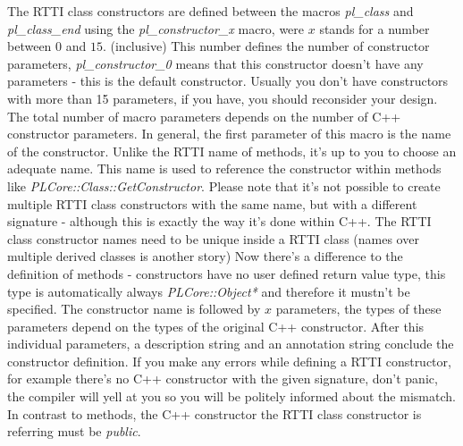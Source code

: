 The RTTI class constructors are defined between the macros \emph{pl\_class} and \emph{pl\_class\_end} using the \emph{pl\_constructor\_x} macro, were $x$ stands for a number between $0$ and $15$. (inclusive) This number defines the number of constructor parameters, \emph{pl\_constructor\_0} means that this constructor doesn't have any parameters - this is the default constructor. Usually you don't have constructors with more than 15 parameters, if you have, you should reconsider your design. The total number of macro parameters depends on the number of C++ constructor parameters. In general, the first parameter of this macro is the name of the constructor. Unlike the RTTI name of methods, it's up to you to choose an adequate name. This name is used to reference the constructor within methods like \emph{PLCore::Class::GetConstructor}. Please note that it's not possible to create multiple RTTI class constructors with the same name, but with a different signature - although this is exactly the way it's done within C++. The RTTI class constructor names need to be unique inside a RTTI class (names over multiple derived classes is another story) Now there's a difference to the definition of methods - constructors have no user defined return value type, this type is automatically always \emph{PLCore::Object*} and therefore it mustn't be specified. The constructor name is followed by $x$ parameters, the types of these parameters depend on the types of the original C++ constructor. After this individual parameters, a description string and an annotation string conclude the constructor definition. If you make any errors while defining a RTTI constructor, for example there's no C++ constructor with the given signature, don't panic, the compiler will yell at you so you will be politely informed about the mismatch. In contrast to methods, the C++ constructor the RTTI class constructor is referring must be \emph{public}.

